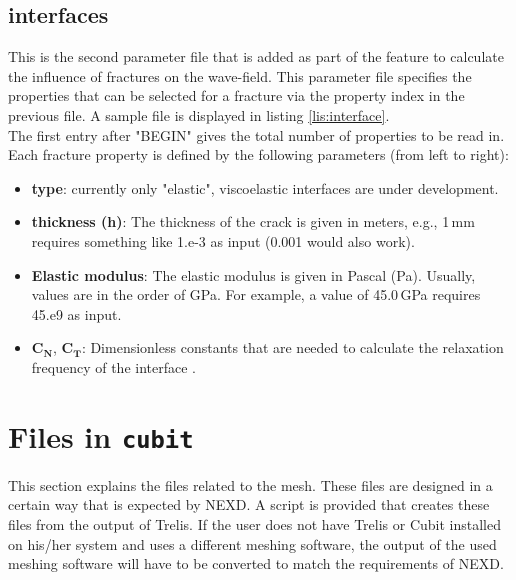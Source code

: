     \subsection{interfaces}
    \label{subsec:interfaces}
    	This is the second parameter file that is added as part of the feature to calculate the influence of fractures on the wave-field. This parameter file specifies the properties that can be selected for a fracture via the property index in the previous file. A sample file is displayed in listing \ref{lis:interface}.
    	 \\
    	The first entry after "BEGIN" gives the total number of properties to be read in. \\
    	Each fracture property is defined by the following parameters (from left to right):
    	\begin{itemize}
    		\item \textbf{type}: currently only "elastic", viscoelastic interfaces are under development.
    		\item \textbf{thickness (h)}: The thickness of the crack is given in meters, e.g., 1\,mm requires something like 1.e-3 as input (0.001 would also work).
    		\item \textbf{Elastic modulus}: The elastic modulus is given in Pascal (Pa). Usually, values are in the order of GPa. For example, a value of 45.0\,GPa requires 45.e9 as input.
    		\item $\mathbf{C_N}$, $\mathbf{C_T}$: Dimensionless constants that are needed to calculate the relaxation frequency of the interface \citep[see][for details]{moeller.2018}.
    	\end{itemize}
    \section{Files in \texttt{cubit}}
    \label{sec:cubfiles}
    	This section explains the files related to the mesh. These files are designed in a certain way that is expected by NEXD. A script is provided that creates these files from the output of Trelis. If the user does not have Trelis or Cubit installed on his/her system and uses a different meshing software, the output of the used meshing software will have to be converted to match the requirements of NEXD.
